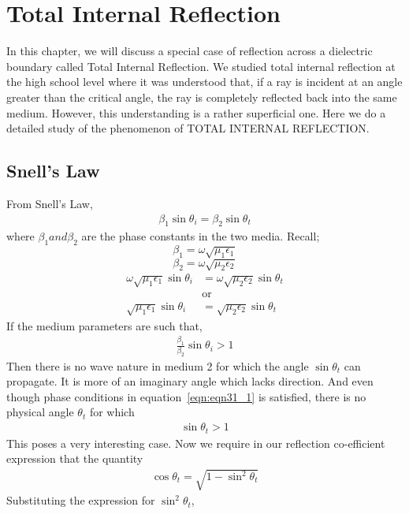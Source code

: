 \chapter{Total Internal Reflection}\label{lec:lec32}

In this chapter, we will discuss a special case of reflection across a dielectric boundary called Total Internal Reflection. We studied total internal reflection at the high school level where it was understood that, if a ray is incident at an angle greater than the critical angle, the ray is completely reflected back into the same medium. However, this understanding is a rather superficial one. Here we do a detailed study of the phenomenon of TOTAL INTERNAL REFLECTION.

\section{Snell's Law}
From Snell's Law,
\begin{align}
\beta_1 \sin\theta_i = \beta_2 \sin\theta_t
\label{eqn:eqn31_1}
\end{align}
where $\beta_1 and \beta_2$ are the phase constants in the two media. Recall;
$$ \beta_{1} = \omega\sqrt{\mu_{1}\epsilon_{1}}$$
$$ \beta_{2} = \omega\sqrt{\mu_{2}\epsilon_{2}}$$
\begin{align*}
\omega\sqrt{\mu_1\epsilon_{1}} \sin\theta_i &= \omega\sqrt{\mu_2\epsilon_2}  \sin\theta_t\\
&\text{or}\\
\sqrt{\mu_1\epsilon_{1}} \sin\theta_i &= \sqrt{\mu_2\epsilon_2}  \sin\theta_t
\end{align*}
If the medium parameters are such that,
\begin{align}
\frac{\beta_1}{\beta_2}\sin\theta_i > 1
\end{align}
Then there is no wave nature in medium 2 for which the angle $\sin\theta_t$ can propagate. It is more of an imaginary angle which lacks direction. And even though phase conditions in equation~\ref{eqn:eqn31_1} is satisfied, there is no physical angle $\theta_t$ for which
\begin{align}
\sin\theta_t > 1
\label{eqn:eqn32_3}
\end{align}
This poses a very interesting case. Now we require in our reflection co-efficient expression that the quantity
\begin{align}
\cos\theta_t = \sqrt{1-\sin^2\theta_t}
\end{align}
Substituting the expression for $\sin^{2}\theta_{t}$,
